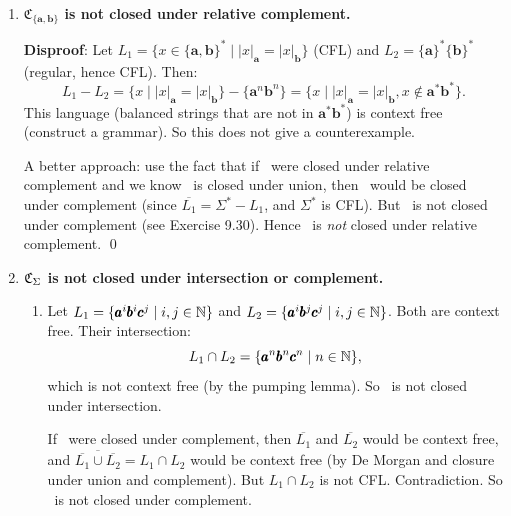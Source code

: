 \begin{enumerate}[{9.}1. ]
Note: $T(\Sigma^*) = \{w^r w \mid w\in\Sigma^*\}$ is in fact the language of \emph{even-length palindromes}, which \emph{is} context free (grammar $S\to\pmb{a}S\pmb{a}\mid\pmb{b}S\pmb{b}\mid\lambda$ for $\Sigma=\{\pmb{a},\pmb{b}\}$), so it cannot serve as a witness for non-closure. The counterexample above using $L=\{\pmb{a}^n\pmb{b}^n\}$ is correct.

Hence \CSIG\ is \emph{not} closed under $T$. $\square$

\item \textbf{$\mathfrak{C}_{\{\pmb{a},\pmb{b}\}}$ is not closed under relative complement.}

\textbf{Disproof}: Let $L_1 = \{x \in \{\pmb{a},\pmb{b}\}^* \mid |x|_{\pmb{a}} = |x|_{\pmb{b}}\}$ (CFL) and $L_2 = \{\pmb{a}\}^*\{\pmb{b}\}^*$ (regular, hence CFL). Then:
\[
L_1 - L_2 = \{x \mid |x|_{\pmb{a}} = |x|_{\pmb{b}}\} - \{\pmb{a}^n\pmb{b}^n\} = \{x \mid |x|_{\pmb{a}}=|x|_{\pmb{b}}, x \notin \pmb{a}^*\pmb{b}^*\}.
\]
This language (balanced strings that are not in $\pmb{a}^*\pmb{b}^*$) is context free (construct a grammar). So this does not give a counterexample.

A better approach: use the fact that if \CSIG\ were closed under relative complement and we know \CSIG\ is closed under union, then \CSIG\ would be closed under complement (since $\overline{L_1} = \Sigma^* - L_1$, and $\Sigma^*$ is CFL). But \CSIG\ is not closed under complement (see Exercise 9.30). Hence \CSIG\ is \emph{not} closed under relative complement. \qed

\item \textbf{$\mathfrak{C}_\Sigma$ is not closed under intersection or complement.}

\begin{enumerate}
\item Let $L_1 = \{\pmb{a}^i\pmb{b}^i\pmb{c}^j \mid i,j \in \mathbb{N}\}$ and $L_2 = \{\pmb{a}^i\pmb{b}^j\pmb{c}^j \mid i,j \in \mathbb{N}\}$. Both are context free. Their intersection:
\[
L_1 \cap L_2 = \{\pmb{a}^n\pmb{b}^n\pmb{c}^n \mid n \in \mathbb{N}\},
\]
which is not context free (by the pumping lemma). So \CSIG\ is not closed under intersection.

If \CSIG\ were closed under complement, then $\overline{L_1}$ and $\overline{L_2}$ would be context free, and $\overline{\overline{L_1} \cup \overline{L_2}} = L_1 \cap L_2$ would be context free (by De Morgan and closure under union and complement). But $L_1 \cap L_2$ is not CFL. Contradiction. So \CSIG\ is not closed under complement.


\end{enumerate}
\end{enumerate}
